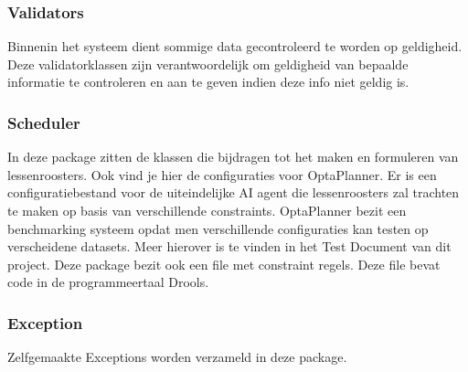 \subsubsection{Validators}
\label{subsec:validators}
Binnenin het systeem dient sommige data gecontroleerd te worden op geldigheid. 
Deze validatorklassen zijn verantwoordelijk om geldigheid van bepaalde informatie te controleren en aan te geven indien deze info niet geldig is.

\subsubsection{Scheduler}
\label{subsec:scheduler}
In deze package zitten de klassen die bijdragen tot het maken en formuleren van lessenroosters.
Ook vind je hier de configuraties voor OptaPlanner.
Er is een configuratiebestand voor de uiteindelijke AI agent die lessenroosters zal trachten te maken op basis van verschillende constraints.
OptaPlanner bezit een benchmarking systeem opdat men verschillende configuraties kan testen op verscheidene datasets.
Meer hierover is te vinden in het Test Document van dit project.
Deze package bezit ook een file met constraint regels.
Deze file bevat code in de programmeertaal Drools\cite{Drools}.

\subsubsection{Exception}
\label{subsec:exception}
Zelfgemaakte Exceptions worden verzameld in deze package.